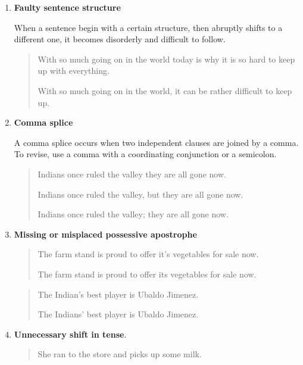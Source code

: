 \begin{enumerate}
\item \textbf{Faulty sentence structure}

When a sentence begin with a certain structure, then abruptly shifts to a different
one, it becomes disorderly and difficult to follow. 

\begin{quote}
With so much going on in the world today is why it is so hard to 
keep up with everything. 

With so much going on in the world, it can be rather difficult to keep up. 

\end{quote}


\item \textbf{Comma splice}

A comma splice occurs when two independent clauses are joined by a comma. To
revise, use a comma with a coordinating conjunction or a semicolon.

\begin{quote}
Indians once ruled the valley they are all gone now. 

Indians once ruled the valley, but they are all gone now. 

Indians once ruled the valley; they are all gone now. 

\end{quote}

\item \textbf{Missing or misplaced possessive apostrophe}

\begin{quote}
The farm stand is proud to offer it's vegetables for sale now. 

The farm stand is proud to offer its vegetables for sale now. 
\end{quote}

\begin{quote}

The Indian's best player is Ubaldo Jimenez. 

The Indians' best player is Ubaldo Jimenez. 

\end{quote}


\item \textbf{Unnecessary shift in tense}.

\begin{quote}
She ran to the store and picks up some milk. 


\end{quote}
\end{enumerate}
